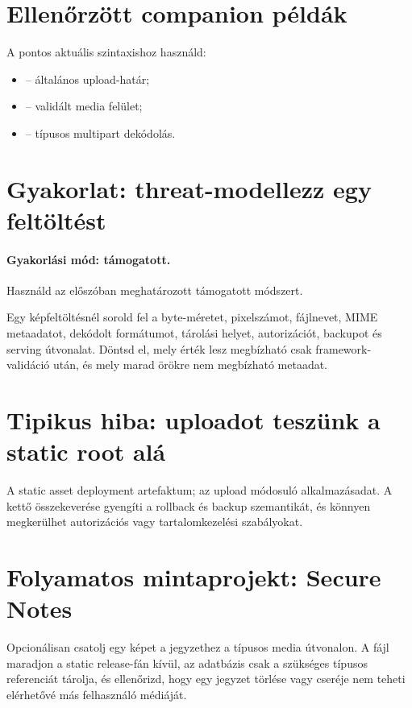 \section{Ellenőrzött companion példák}
A pontos aktuális szintaxishoz használd:
\begin{itemize}
  \item {} -- általános upload-határ;
  \item {} -- validált media felület;
  \item {} -- típusos multipart dekódolás.
\end{itemize}

\section{Gyakorlat: threat-modellezz egy feltöltést}
\paragraph{Gyakorlási mód: támogatott.} Használd az előszóban meghatározott támogatott módszert.

Egy képfeltöltésnél sorold fel a byte-méretet, pixelszámot, fájlnevet, MIME metaadatot, dekódolt formátumot, tárolási helyet, autorizációt, backupot és serving útvonalat. Döntsd el, mely érték lesz megbízható csak framework-validáció után, és mely marad örökre nem megbízható metaadat.

\section{Tipikus hiba: uploadot teszünk a static root alá}
A static asset deployment artefaktum; az upload módosuló alkalmazásadat. A kettő összekeverése gyengíti a rollback és backup szemantikát, és könnyen megkerülhet autorizációs vagy tartalomkezelési szabályokat.

\section{Folyamatos mintaprojekt: Secure Notes}
Opcionálisan csatolj egy képet a jegyzethez a típusos media útvonalon. A fájl maradjon a static release-fán kívül, az adatbázis csak a szükséges típusos referenciát tárolja, és ellenőrizd, hogy egy jegyzet törlése vagy cseréje nem teheti elérhetővé más felhasználó médiáját.
